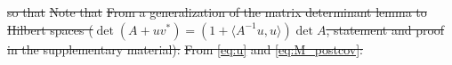 \documentclass[ba]{imsart}
\newcommand{\M}{\mathcal{M}}
\newcommand{\obs}{\mathcal{O}}
\newcommand{\fwd}{\mathcal{F}}
\newcommand{\obsm}{\widehat{\obs}}
\newcommand{\Sigmam}{\widehat{\Sigma}}
\newcommand{\postcovm}{\widehat{\Gamma_{\textup{post}}}}
\newcommand{\tar}{\Psi}
\newcommand{\meas}{\mathbf{o}}
\theoremstyle{plain}
\theoremstyle{definition}
\theoremstyle{remark}
\providecommand{\DIFdeltex}[1]{{\protect\color{red}\sout{#1}}}                      %
\providecommand{\DIFdel}[1]{\texorpdfstring{\DIFdeltex{#1}}{}} %
\begin{document}
  \DIFdel{so that
  }%
  \DIFdel{Note that
  }%
\DIFdel{From a generalization of the matrix determinant lemma to Hilbert
  spaces ($\det(A + uv^*) = (1 + \langle A^{-1} u,u \rangle) \det
  A$, statement and proof in the supplementary material):
  }%
\DIFdel{From \eqref{eq:u} and \eqref{eq:M_postcov}:
  }%
\end{document}
